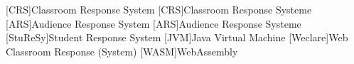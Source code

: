 \begin{acronym}[StuReSy]
    [CRS]{Classroom Response System}
    [CRS]{Classroom Response Systeme}
    [ARS]{Audience Response System}
    [ARS]{Audience Response Systeme}
    [StuReSy]{Student Response System}
    [JVM]{Java Virtual Machine}
    [Weclare]{Web Classroom Response (System)}
    [WASM]{WebAssembly}
\end{acronym}
